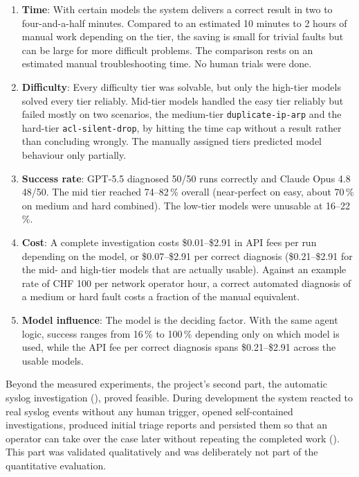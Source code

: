 \begin{enumerate}
    \item \textbf{Time}: With certain models the system delivers a correct result in two to
          four-and-a-half minutes. Compared to an
          estimated 10 minutes to 2 hours of manual work depending on the tier, the saving is
          small for trivial faults but can be large for more difficult problems. The comparison rests on an
          estimated manual troubleshooting time. No human trials were done.
    \item \textbf{Difficulty}: Every difficulty tier was solvable, but only the
          high-tier models solved every tier reliably. Mid-tier models handled the easy tier reliably but
          failed mostly on two scenarios, the medium-tier \texttt{duplicate-ip-arp} and the hard-tier
          \texttt{acl-silent-drop}, by hitting the time cap without a result rather than
          concluding wrongly. The manually assigned tiers predicted model behaviour only partially.
    \item \textbf{Success rate}: GPT-5.5 diagnosed 50/50 runs correctly and Claude Opus 4.8
          48/50. The mid tier reached 74--82\,\% overall (near-perfect on easy, about 70\,\%
          on medium and hard combined). The low-tier models were unusable at 16--22\,\%.
    \item \textbf{Cost}: A complete investigation costs \$0.01--\$2.91 in API
          fees per run depending on the model, or \$0.07--\$2.91 per correct diagnosis
          (\$0.21--\$2.91 for the mid- and high-tier models that are actually usable). Against an
          example rate of CHF 100 per network operator hour, a correct automated diagnosis of a medium or
          hard fault costs a fraction of the manual equivalent.
    \item \textbf{Model influence}: The model is the deciding factor.
          With the same agent logic, success ranges from 16\,\% to 100\,\% depending only on which
          model is used, while the API fee per correct diagnosis spans \$0.21--\$2.91 across the
          usable models.
\end{enumerate}

Beyond the measured experiments, the project's second part, the automatic syslog
investigation (), proved feasible. During development the
system reacted to real syslog events without any human trigger, opened self-contained
investigations, produced initial triage reports and persisted them so that an operator can
take over the case later without repeating the completed work
(). This part was validated qualitatively and was deliberately
not part of the quantitative evaluation.

